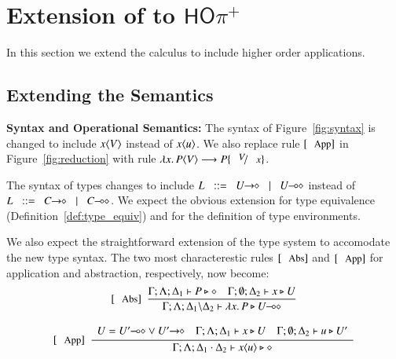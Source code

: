 \newcommand{\HOpp}{\ensuremath{\mathsf{HO\pi^{+}}}\xspace}
\section{Extension of \HOp to \HOpp}

In this section we extend the \HOp calculus to include higher order applications.

\subsection{Extending the Semantics}

{\bf Syntax and Operational Semantics:}
The syntax of Figure~\ref{fig:syntax} is changed to include $x\langle V \rangle$
instead of $x\langle u \rangle$.
We also replace rule $\orule{App}$ in Figure~\ref{fig:reduction}
with rule $\appl{\abs{x}{P}}{V} \red P \subst{V}{x}$.

The syntax of types changes to include $L \bnfis \shot{U} \bnfbar \lhot{U}$
instead of $L \bnfis \shot{C} \bnfbar \lhot{C}$. We expect the obvious
extension for type equivalence (Definition~\ref{def:type_equiv})
and for the definition of type environments.

We also expect the straightforward extension of the type 
system to accomodate the new type syntax. The two
most characterestic rules $\trule{Abs}$ and $\trule{App}$ 
for application and abstraction, respectively, now become:
\[
	\begin{array}{c}
		\trule{Abs}~~\tree{
			\Gamma; \Lambda; \Delta_1 \proves P \hastype \Proc
			\quad
			\Gamma; \es; \Delta_2 \proves x \hastype U
		}{
			\Gamma; \Lambda; \Delta_1 \backslash \Delta_2 \proves \abs{x}{P} \hastype \lhot{U}
		}
		\\[6mm]

		\trule{App}~~\tree{
			\begin{array}{c}
				U = \lhot{U'} \lor \shot{U'}
				\quad
				\Gamma; \Lambda; \Delta_1 \proves x \hastype U
				\quad
				\Gamma; \es; \Delta_2 \proves u \hastype U'
			\end{array}
		}{
			\Gamma; \Lambda; \Delta_1 \cat \Delta_2 \proves \appl{x}{u} \hastype \Proc
		} 
	\end{array}
\]


